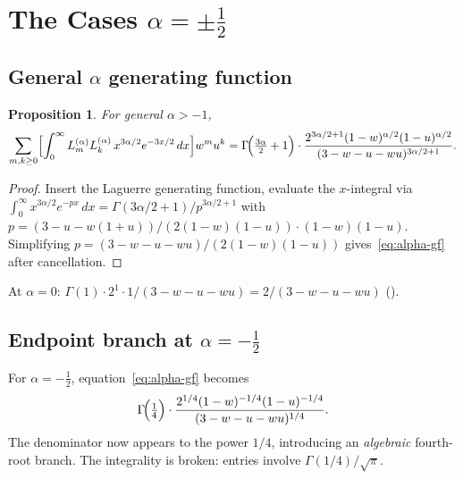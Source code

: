 \documentclass[11pt,a4paper]{article}
\theoremstyle{definition}
\theoremstyle{plain}
\newtheorem{proposition}[definition]{Proposition}
\begin{document}
\section{The Cases \texorpdfstring{$\alpha=\pm\frac12$}{alpha=+/-1/2}}

\subsection{General \texorpdfstring{$\alpha$}{alpha} generating function}

\begin{proposition}\label{prop:alpha-gf}
For general $\alpha > -1$,
\begin{equation}\label{eq:alpha-gf}
  \sum_{m,k\ge 0}
  \Bigl[\int_0^\infty L_m^{(\alpha)}L_k^{(\alpha)}\,x^{3\alpha/2}e^{-3x/2}\,dx\Bigr]
  w^m u^k
  = \Gamma\!\Bigl(\tfrac{3\alpha}{2}+1\Bigr)\cdot
    \frac{2^{3\alpha/2+1}(1-w)^{\alpha/2}(1-u)^{\alpha/2}}{(3-w-u-wu)^{3\alpha/2+1}}.
\end{equation}
\end{proposition}

\begin{proof}
Insert the Laguerre generating function, evaluate the $x$-integral via
$\int_0^\infty x^{3\alpha/2}e^{-px}\,dx = \Gamma(3\alpha/2+1)/p^{3\alpha/2+1}$
with $p = (3-u-w(1+u))/(2(1-w)(1-u)) \cdot (1-w)(1-u)$. Simplifying
$p = (3-w-u-wu)/(2(1-w)(1-u))$ gives~\eqref{eq:alpha-gf} after cancellation.
\end{proof}

\noindent At $\alpha=0$: $\Gamma(1)\cdot 2^1\cdot 1/(3-w-u-wu) = 2/(3-w-u-wu)$ (\checkmark).

\subsection{Endpoint branch at \texorpdfstring{$\alpha=-\frac12$}{alpha=-1/2}}

For $\alpha=-\tfrac12$, equation~\eqref{eq:alpha-gf} becomes
\begin{equation}\label{eq:neg-half-gf}
  \Gamma\!\Bigl(\tfrac14\Bigr)\cdot
  \frac{2^{1/4}(1-w)^{-1/4}(1-u)^{-1/4}}{(3-w-u-wu)^{1/4}}.
\end{equation}
The denominator now appears to the power $1/4$, introducing an
\emph{algebraic} fourth-root branch. The integrality is broken:
entries involve $\Gamma(1/4)/\sqrt{\pi}$.
\end{document}
